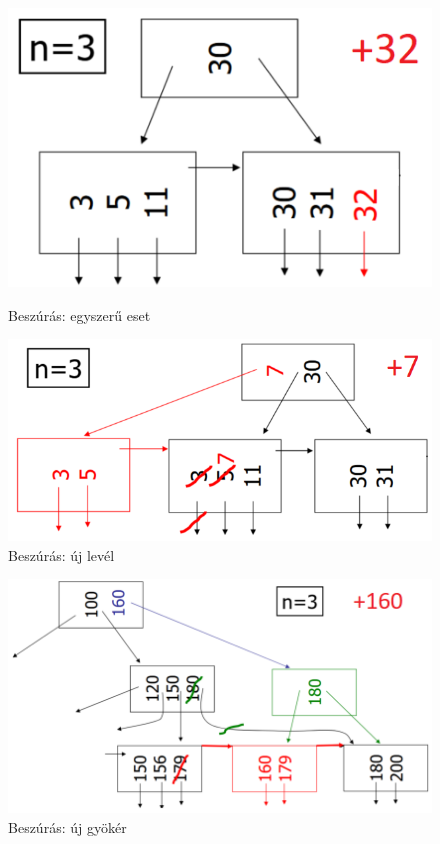 \documentclass[12pt,a4paper]{article}
\begin{document}
\begin{figure}[h!]
	\centering
	\begin{minipage}{0.5\textwidth}
		\centering
		\includegraphics[width=0.7\linewidth]{"b+ beszúrás egyszerű"}
		\captionsetup{labelformat=empty}
		\caption{Beszúrás: egyszerű eset}
	\end{minipage}%
	\begin{minipage}{0.5\textwidth}
		\centering
		\includegraphics[width=1\linewidth]{"b+ beszúrás új levél"}
		\captionsetup{labelformat=empty}
		\caption{Beszúrás: új levél}
	\end{minipage}
\end{figure}

\begin{figure}[h!]
	\centering
	\includegraphics[width=0.6\linewidth]{"b+ beszúrás új köztes"}
	\captionsetup{labelformat=empty}
	\caption{Beszúrás: új gyökér}
\end{figure}
\end{document}

